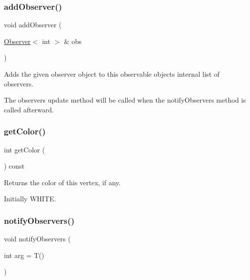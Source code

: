 \subsubsection{\texorpdfstring{add\+Observer()}{addObserver()}\hspace{0.1cm}{\footnotesize\ttfamily [2/2]}}
{\footnotesize\ttfamily void add\+Observer (\begin{DoxyParamCaption}\item[{\mbox{\hyperlink{classObserver}{Observer}}$<$ int  $>$ \&}]{obs }\end{DoxyParamCaption})\hspace{0.3cm}{\ttfamily [inherited]}}



Adds the given observer object to this observable object\textquotesingle{}s internal list of observers. 

The observer\textquotesingle{}s update method will be called when the notify\+Observers method is called afterward. \mbox{\label{classVertexGen_a0a56fe92b545a9b650fe5cde9a756ea7}} 
\subsubsection{\texorpdfstring{get\+Color()}{getColor()}}
{\footnotesize\ttfamily int get\+Color (\begin{DoxyParamCaption}{ }\end{DoxyParamCaption}) const}



Returns the color of this vertex, if any. 

Initially W\+H\+I\+TE. \mbox{\label{classObservable_a337380718b992689248fac2927145c62}} 
\subsubsection{\texorpdfstring{notify\+Observers()}{notifyObservers()}}
{\footnotesize\ttfamily void notify\+Observers (\begin{DoxyParamCaption}\item[{int}]{arg = {\ttfamily T()} }\end{DoxyParamCaption})\hspace{0.3cm}{\ttfamily [inherited]}}



